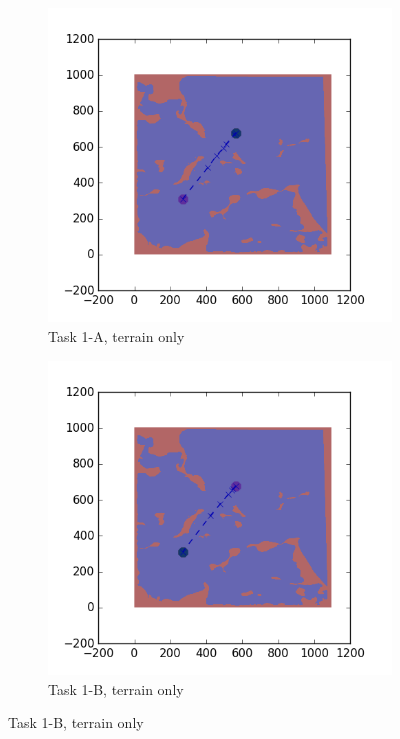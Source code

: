 \documentclass{tamuccthesis}
\begin{document}
\begin{figure}
    \centering
    \begin{subfigure}[b]{0.4\textwidth}
        \centering
        \includegraphics[width=\textwidth,trim={3cm 3cm 3cm 3cm},clip]{EXP3RG_PathAa_-1_-1_0_0.png}
        \caption{{\small Task 1-A, terrain only}}
        \label{fig:Path_1-A_terrain_only}
    \end{subfigure}
    \hfill
    \begin{subfigure}[b]{0.4\textwidth}  
        \centering 
        \includegraphics[width=\textwidth,trim={3cm 3cm 3cm 3cm},clip]{EXP3RG_PathAb_-1_-1_0_0.png}
        \caption{{\small Task 1-B, terrain only}}   
        \label{fig:Path_1-B_terrain_only}
    \end{subfigure}
    

\end{figure}
\end{document}
